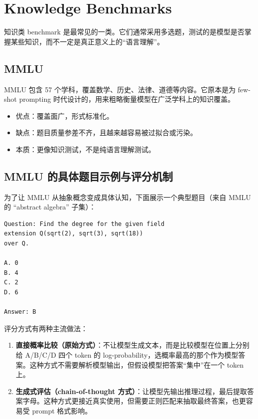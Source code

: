 \section{Knowledge Benchmarks}

知识类 benchmark 是最常见的一类。它们通常采用多选题，测试的是模型是否掌握某些知识，而不一定是真正意义上的``语言理解''。

\subsection{MMLU}

MMLU 包含 57 个学科，覆盖数学、历史、法律、道德等内容。它原本是为 few-shot prompting 时代设计的，用来粗略衡量模型在广泛学科上的知识覆盖。

\begin{itemize}
    \item 优点：覆盖面广，形式标准化。
    \item 缺点：题目质量参差不齐，且越来越容易被过拟合或污染。
    \item 本质：更像知识测试，不是纯语言理解测试。
\end{itemize}

\subsection{MMLU 的具体题目示例与评分机制}

为了让 MMLU 从抽象概念变成具体认知，下面展示一个典型题目（来自 MMLU 的 ``abstract algebra'' 子集）：

\begin{lstlisting}[caption={MMLU 典型题目格式（abstract algebra 子集）},language={}]
Question: Find the degree for the given field
extension Q(sqrt(2), sqrt(3), sqrt(18))
over Q.

A. 0
B. 4
C. 2
D. 6

Answer: B
\end{lstlisting}

评分方式有两种主流做法：

\begin{enumerate}
    \item \textbf{直接概率比较（原始方式）}：不让模型生成文本，而是比较模型在位置上分别给 A/B/C/D 四个 token 的 log-probability，选概率最高的那个作为模型答案。这种方式不需要解析模型输出，但假设模型把答案``集中''在一个 token 上。
    \item \textbf{生成式评估（chain-of-thought 方式）}：让模型先输出推理过程，最后提取答案字母。这种方式更接近真实使用，但需要正则匹配来抽取最终答案，也更容易受 prompt 格式影响。
\end{enumerate}


